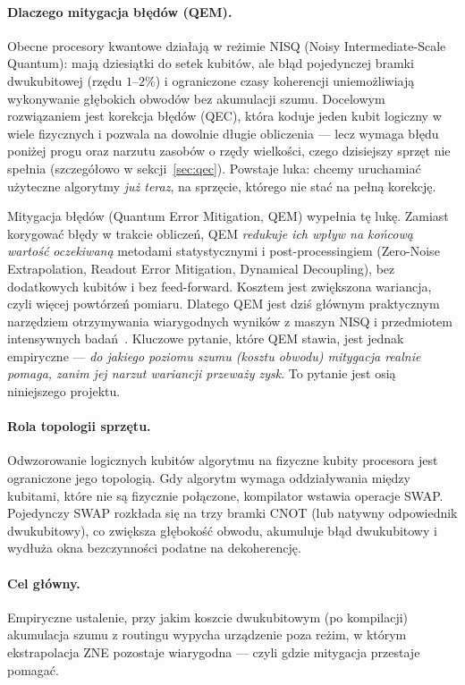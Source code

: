 \documentclass[11pt,a4paper]{article}
\begin{document}
\paragraph{Dlaczego mitygacja błędów (QEM).} Obecne procesory kwantowe działają
w reżimie NISQ (Noisy Intermediate-Scale Quantum): mają dziesiątki do setek kubitów, ale
błąd pojedynczej bramki dwukubitowej (rzędu $1$--$2\%$) i ograniczone czasy koherencji
uniemożliwiają wykonywanie głębokich obwodów bez akumulacji szumu. Docelowym rozwiązaniem
jest korekcja błędów (QEC), która koduje jeden kubit logiczny w wiele fizycznych i pozwala
na dowolnie długie obliczenia --- lecz wymaga błędu poniżej progu oraz narzutu zasobów o
rzędy wielkości, czego dzisiejszy sprzęt nie spełnia (szczegółowo w sekcji~\ref{sec:qec}).
Powstaje luka: chcemy uruchamiać użyteczne algorytmy \emph{już teraz}, na sprzęcie, którego
nie stać na pełną korekcję.

Mitygacja błędów (Quantum Error Mitigation, QEM) wypełnia tę lukę. Zamiast korygować błędy
w trakcie obliczeń, QEM \emph{redukuje ich wpływ na końcową wartość oczekiwaną} metodami
statystycznymi i post-processingiem (Zero-Noise Extrapolation, Readout Error Mitigation,
Dynamical Decoupling), bez dodatkowych kubitów i bez feed-forward. Kosztem jest zwiększona
wariancja, czyli więcej powtórzeń pomiaru. Dlatego QEM jest dziś głównym praktycznym narzędziem otrzymywania wiarygodnych
wyników z maszyn NISQ i przedmiotem intensywnych badań~\cite{cai2023}. Kluczowe pytanie, które QEM stawia, jest jednak empiryczne --- \emph{do
jakiego poziomu szumu (kosztu obwodu) mitygacja realnie pomaga, zanim jej narzut wariancji
przeważy zysk}. To pytanie jest osią niniejszego projektu.

\paragraph{Rola topologii sprzętu.}
Odwzorowanie logicznych kubitów algorytmu na fizyczne kubity procesora jest ograniczone
jego topologią. Gdy algorytm wymaga oddziaływania między kubitami, które nie są fizycznie
połączone, kompilator wstawia operacje SWAP. Pojedynczy SWAP rozkłada się na trzy bramki
CNOT (lub natywny odpowiednik dwukubitowy), co zwiększa głębokość obwodu, akumuluje błąd
dwukubitowy i wydłuża okna bezczynności podatne na dekoherencję.

\paragraph{Cel główny.} Empiryczne ustalenie, przy jakim koszcie dwukubitowym (po
kompilacji) akumulacja szumu z routingu wypycha urządzenie poza reżim, w którym
ekstrapolacja ZNE pozostaje wiarygodna --- czyli gdzie mitygacja przestaje pomagać.
\end{document}
